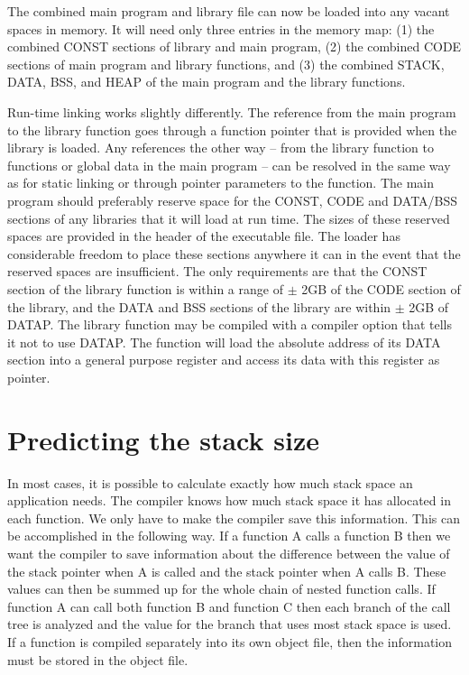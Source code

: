 \documentclass[forwardcom.tex]{subfiles}
\begin{document}
The combined main program and library file can now be loaded into any vacant spaces in memory. It will need only three entries in the memory map: (1) the combined CONST sections of library and main program, (2) the combined CODE sections of main program and library functions, and (3) the combined STACK, DATA, BSS, and HEAP of the main program and the library functions. 
\vspace{2mm}

Run-time linking works slightly differently. The reference from the main program to the library function goes through a function pointer that is provided when the library is loaded. Any references the other way -- from the library function to functions or global data in the main 
program -- can be resolved in the same way as for static linking or through pointer parameters to the function. The main program should preferably reserve space for the CONST, CODE and DATA/BSS sections of any libraries that it will load at run time. The sizes of these reserved spaces are provided in the header of the executable file. The loader has considerable freedom to place these sections anywhere it can in the event that the reserved spaces are insufficient. The only requirements are that the CONST section of the library function is within a range of $\pm$ 2GB of the CODE section of the library, and the DATA and BSS sections of the library are within $\pm$ 2GB of DATAP. The library function may be compiled with a compiler option that tells it not to use DATAP. The function will load the absolute address of its DATA section into a general purpose register and access its data with this register as pointer. 
\vspace{2mm}

\section{Predicting the stack size} \label{predictingStackSize}
In most cases, it is possible to calculate exactly how much stack space an application needs. The compiler knows how much stack space it has allocated in each function. We only have to make the compiler save this information. This can be accomplished in the following way. If a function A calls a function B then we want the compiler to save information about the difference between the value of the stack pointer when A is called and the stack pointer when A calls B. These values can then be summed up for the whole chain of nested function calls. If function A can call both function B and function C then each branch of the call tree is analyzed and the value for the branch that uses most stack space is used. If a function is compiled separately into its own object file, then the information must be stored in the object file. 
\vspace{2mm}
\end{document}
